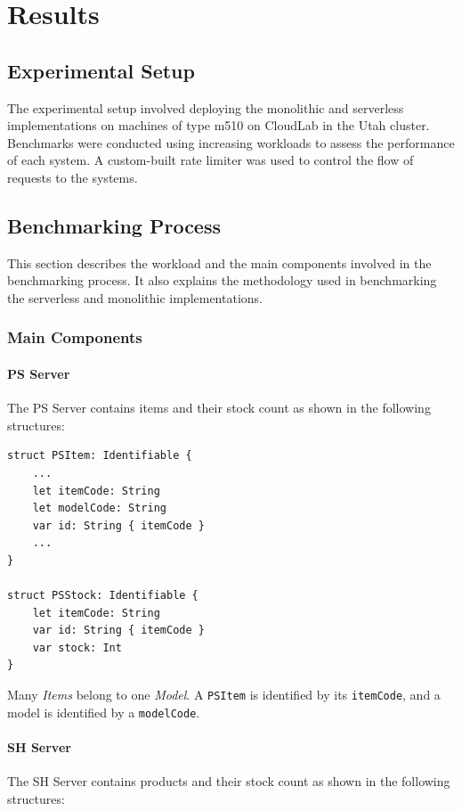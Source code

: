 \chapter{Results}
\section{Experimental Setup}

The experimental setup involved deploying the monolithic and serverless implementations on machines of type m510 on CloudLab in the Utah cluster. Benchmarks were conducted using increasing workloads to assess the performance of each system. A custom-built rate limiter was used to control the flow of requests to the systems.

\section{Benchmarking Process}

This section describes the workload and the main components involved in the benchmarking process. It also explains the methodology used in benchmarking the serverless and monolithic implementations.

\subsection{Main Components}

\subsubsection{PS Server}
The PS Server contains items and their stock count as shown in the following structures:

\begin{verbatim}
struct PSItem: Identifiable {
    ...
    let itemCode: String
    let modelCode: String
    var id: String { itemCode }
    ...
}

struct PSStock: Identifiable {
    let itemCode: String
    var id: String { itemCode }
    var stock: Int
}
\end{verbatim}

Many \textit{Items} belong to one \textit{Model}. A \texttt{PSItem} is identified by its \texttt{itemCode}, and a model is identified by a \texttt{modelCode}.

\subsubsection{SH Server}
The SH Server contains products and their stock count as shown in the following structures:

